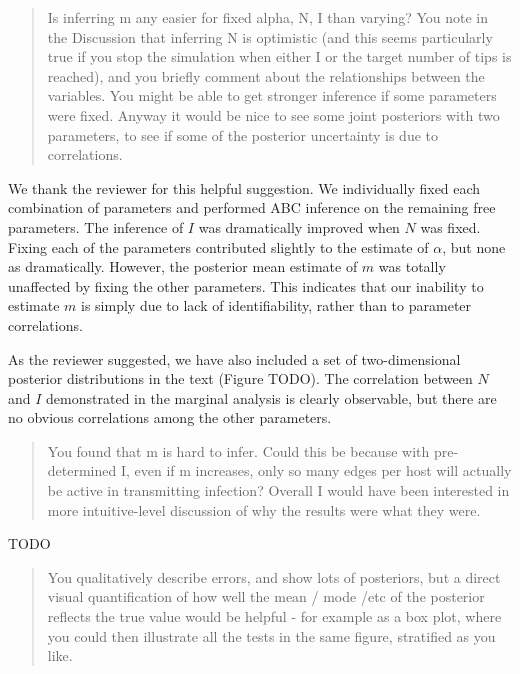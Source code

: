 \documentclass[12pt]{letter}
\begin{document}
\begin{letter}{ }
\begin{quote}
  Is inferring m any easier for fixed alpha, N, I than varying? You note in the
  Discussion that inferring N is optimistic (and this seems particularly true
  if you stop the simulation when either I or the target number of tips is
  reached), and you briefly comment about the relationships between the
  variables. You might be able to get stronger inference if some parameters
  were fixed. Anyway it would be nice to see some joint posteriors with two
  parameters, to see if some of the posterior uncertainty is due to
  correlations.
\end{quote}

We thank the reviewer for this helpful suggestion. We individually fixed each
combination of parameters and performed ABC inference on the remaining free
parameters. The inference of $I$ was dramatically improved when $N$ was fixed.
Fixing each of the parameters contributed slightly to the estimate of $\alpha$,
but none as dramatically. However, the posterior mean estimate of $m$ was
totally unaffected by fixing the other parameters. This indicates that our
inability to estimate $m$ is simply due to lack of identifiability, rather than
to parameter correlations. 

As the reviewer suggested, we have also included a set of two-dimensional
posterior distributions in the text (Figure TODO). The correlation between $N$
and $I$ demonstrated in the marginal analysis is clearly observable, but there
are no obvious correlations among the other parameters.

\begin{quote}
  \itshape

  You found that m is hard to infer. Could this be because with pre-determined
  I, even if m increases, only so many edges per host will actually be active
  in transmitting infection? Overall I would have been interested in more
  intuitive-level discussion of why the results were what they were.
\end{quote}

  TODO

\begin{quote}
  \itshape

  You qualitatively describe errors, and show lots of posteriors, but a direct
  visual quantification of how well the mean / mode /etc of the posterior
  reflects the true value would be helpful - for example as a box plot, where
  you could then illustrate all the tests in the same figure, stratified as you
  like.
\end{quote}


\end{letter}
\end{document}
